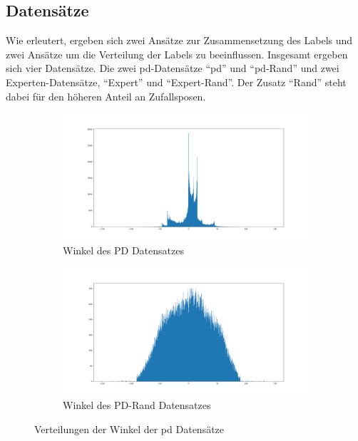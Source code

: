 \subsection{Datensätze}

Wie erleutert, ergeben sich zwei Ansätze zur Zusammensetzung des Labels und zwei Ansätze um die Verteilung der Labels zu beeinflussen. Insgesamt ergeben sich vier Datensätze. Die zwei \acs{pd}-Datensätze ``\acs{pd}'' und ``\acs{pd}-Rand'' und zwei Experten-Datensätze, ``Expert'' und ``Expert-Rand''. Der Zusatz ``Rand'' steht dabei für den höheren Anteil an Zufallsposen.\\

\begin{figure}[H]
	\centering
	\begin{subfigure}{0.5\textwidth}
		\centering
		\includegraphics[width=\linewidth]{kapitel4/images/plots/pd-angles.png}
		\caption{Winkel des PD Datensatzes}
		\label{pd-drive-angles}
	\end{subfigure}%
	\begin{subfigure}{0.5\textwidth}
		\centering
		\includegraphics[width=\linewidth]{kapitel4/images/plots/pd-rand-angles.png}
		\caption{Winkel des PD-Rand Datensatzes}
		\label{pd-rand-angles}
	\end{subfigure}
	\caption{Verteilungen der Winkel der \acs{pd} Datensätze}
	\label{pd-angles}
\end{figure}


